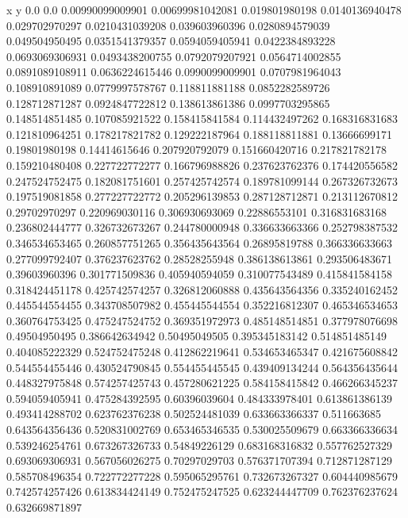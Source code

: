               x                y
            0.0              0.0
0.00990099009901  0.00699981042081
 0.019801980198  0.0140136940478
 0.029702970297  0.0210431039208
 0.039603960396  0.0280894579039
 0.049504950495  0.0351541379357
0.0594059405941  0.0422384893228
0.0693069306931  0.0493438200755
0.0792079207921  0.0564714002855
0.0891089108911  0.0636224615446
0.0990099009901  0.0707981964043
 0.108910891089  0.0779997578767
 0.118811881188  0.0852282589726
 0.128712871287  0.0924847722812
 0.138613861386  0.0997703295865
 0.148514851485   0.107085921522
 0.158415841584   0.114432497262
 0.168316831683   0.121810964251
 0.178217821782   0.129222187964
 0.188118811881    0.13666699171
  0.19801980198    0.14414615646
 0.207920792079   0.151660420716
 0.217821782178   0.159210480408
 0.227722772277   0.166796988826
 0.237623762376   0.174420556582
 0.247524752475   0.182081751601
 0.257425742574   0.189781099144
 0.267326732673   0.197519081858
 0.277227722772   0.205296139853
 0.287128712871   0.213112670812
  0.29702970297   0.220969030116
 0.306930693069    0.22886553101
 0.316831683168   0.236802444777
 0.326732673267   0.244780000948
 0.336633663366   0.252798387532
 0.346534653465   0.260857751265
 0.356435643564    0.26895819788
 0.366336633663   0.277099792407
 0.376237623762    0.28528255948
 0.386138613861   0.293506483671
  0.39603960396   0.301771509836
 0.405940594059   0.310077543489
 0.415841584158   0.318424451178
 0.425742574257   0.326812060888
 0.435643564356   0.335240162452
 0.445544554455   0.343708507982
 0.455445544554   0.352216812307
 0.465346534653   0.360764753425
 0.475247524752   0.369351972973
 0.485148514851   0.377978076698
  0.49504950495   0.386642634942
  0.50495049505   0.395345183142
 0.514851485149   0.404085222329
 0.524752475248   0.412862219641
 0.534653465347   0.421675608842
 0.544554455446   0.430524790845
 0.554455445545   0.439409134244
 0.564356435644   0.448327975848
 0.574257425743   0.457280621225
 0.584158415842   0.466266345237
 0.594059405941   0.475284392595
  0.60396039604   0.484333978401
 0.613861386139   0.493414288702
 0.623762376238   0.502524481039
 0.633663366337      0.511663685
 0.643564356436   0.520831002769
 0.653465346535   0.530025509679
 0.663366336634   0.539246254761
 0.673267326733    0.54849226129
 0.683168316832   0.557762527329
 0.693069306931   0.567056026275
  0.70297029703   0.576371707394
 0.712871287129   0.585708496354
 0.722772277228   0.595065295761
 0.732673267327   0.604440985679
 0.742574257426   0.613834424149
 0.752475247525   0.623244447709
 0.762376237624   0.632669871897
